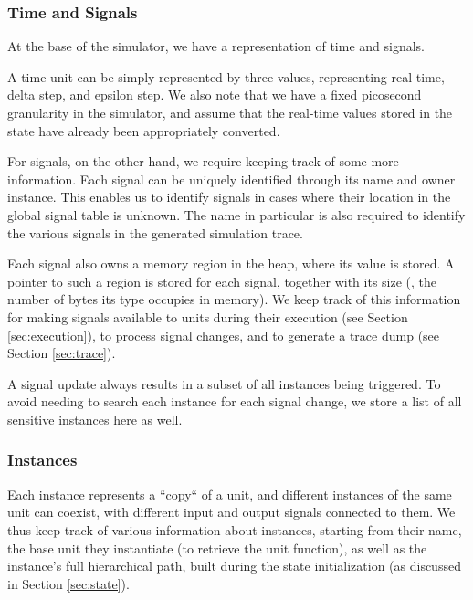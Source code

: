 
\subsubsection{Time and Signals}
At the base of the simulator, we have a representation of time and signals.

A time unit can be simply represented by three values, representing real-time, delta step, and epsilon step. We also note that we have a fixed picosecond granularity in the simulator, and assume that the real-time values stored in the state have already been appropriately converted.

For signals, on the other hand, we require keeping track of some more information. Each signal can be uniquely identified through its name and owner instance. This enables us to identify signals in cases where their location in the global signal table is unknown. The name in particular is also required to identify the various signals in the generated simulation trace.

Each signal also owns a memory region in the heap, where its value is stored. A pointer to such a region is stored for each signal, together with its size (\ie, the number of bytes its type occupies in memory). We keep track of this information for making signals available to units during their execution (see Section \ref{sec:execution}), to process signal changes, and to generate a trace dump (see Section \ref{sec:trace}).

A signal update always results in a subset of all instances being triggered. To avoid needing to search each instance for each signal change, we store a list of all sensitive instances here as well.



\subsubsection{Instances}
Each instance represents a “copy“ of a unit, and different instances of the same unit can coexist, with different input and output signals connected to them. We thus keep track of various information about instances, starting from their name, the base unit they instantiate (to retrieve the unit function), as well as the instance's full hierarchical path, built during the state initialization (as discussed in Section \ref{sec:state}).

